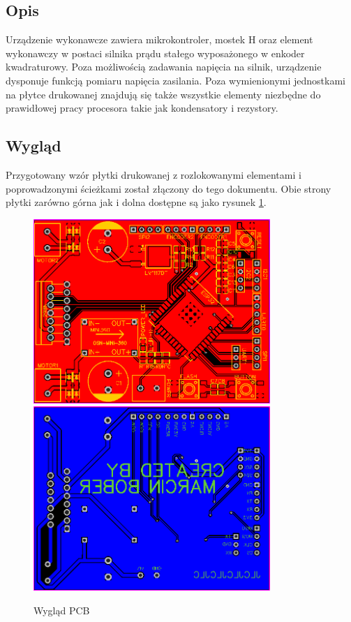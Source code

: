            \subsection{Opis}
                Urządzenie wykonawcze zawiera mikrokontroler, mostek H oraz element wykonawczy w postaci silnika prądu stałego wyposażonego w enkoder kwadraturowy. Poza możliwością zadawania napięcia na silnik, urządzenie dysponuje funkcją pomiaru napięcia zasilania. Poza wymienionymi jednostkami na płytce drukowanej znajdują się także wszystkie elementy niezbędne do prawidłowej pracy procesora takie jak kondensatory i rezystory.
          
            \subsection{Wygląd}
                Przygotowany wzór płytki drukowanej z rozlokowanymi elementami i poprowadzonymi ścieżkami został złączony do tego dokumentu. Obie strony płytki zarówno górna jak i dolna dostępne są jako rysunek \ref{fig:pcb}.
                
                \begin{figure}[ht]
                    \centering
                    \includegraphics[width=0.8\textwidth]{img/pcb_front.png}
                    \includegraphics[width=0.8\textwidth]{img/pcb_back.png}
                    \caption{Wygląd PCB}
                    \label{fig:pcb}
                \end{figure}
    
